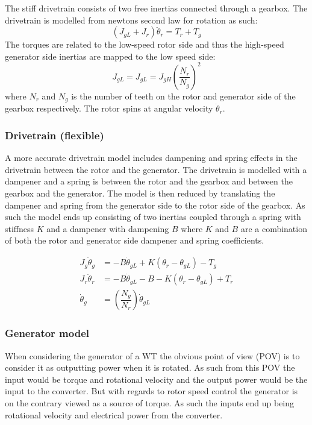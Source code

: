The stiff drivetrain consists of two free inertias connected through a gearbox. The drivetrain is modelled from newtons second law for rotation as such:
\begin{equation}\label{eq:wtlin_comp_drivetrain}
	(J_{gL} + J_{r}) \ddot{\theta}_r = T_{r} + T_{g}
\end{equation}
The torques are related to the low-speed rotor side and thus the high-speed generator side inertias are mapped to the low speed side:
\begin{equation} \label{eq:wtlin_comp_inertiamap}
	J_{gL} = J_{gL} = J_{gH} \left(\dfrac{N_r}{N_g}\right)^2
\end{equation}
where $ N_r $ and $ N_g $ is the number of teeth on the rotor and generator side of the gearbox respectively. The rotor spins at angular velocity $ \dot{\theta}_r $.


\subsubsection{Drivetrain (flexible)}
A more accurate drivetrain model includes dampening and spring effects in the drivetrain between the rotor and the generator. The drivetrain is modelled with a dampener and a spring is between the rotor and the gearbox and between the gearbox and the generator. The model is then reduced by translating the dampener and spring from the generator side to the rotor side of the gearbox. As such the model ends up consisting of two inertias coupled through a spring with stiffness $ K $ and a dampener with dampening $ B $ where $ K $ and $ B $ are a combination of both the rotor and generator side dampener and spring coefficients. 

\begin{align} 
	J_{g} \ddot{\theta}_g & = -B \dot{\theta}_{gL} + K(\theta_r - \theta_{gL}) - T_{g} \label{eq:wtlin_comp_drivetrain_flex_1} \\
	J_{r} \ddot{\theta}_r & = -B \dot{\theta}_{gL} -B - K(\theta_r - \theta_{gL}) + T_{r} \label{eq:wtlin_comp_drivetrain_flex_2} \\
	\dot{\theta}_g & = \left(\dfrac{N_g}{N_r}\right) \dot{\theta}_{gL} \label{eq:wtlin_comp_drivetrain_flex_3}
\end{align}

\clearpage \newpage
\subsubsection{Generator model}
When considering the generator of a WT the obvious point of view (POV) is to consider it as outputting power when it is rotated. As such from this POV the input would be torque and rotational velocity and the output power would be the input to the converter. But with regards to rotor speed control the generator is on the contrary viewed as a source of torque. As such the inputs end up being rotational velocity and electrical power from the converter.

